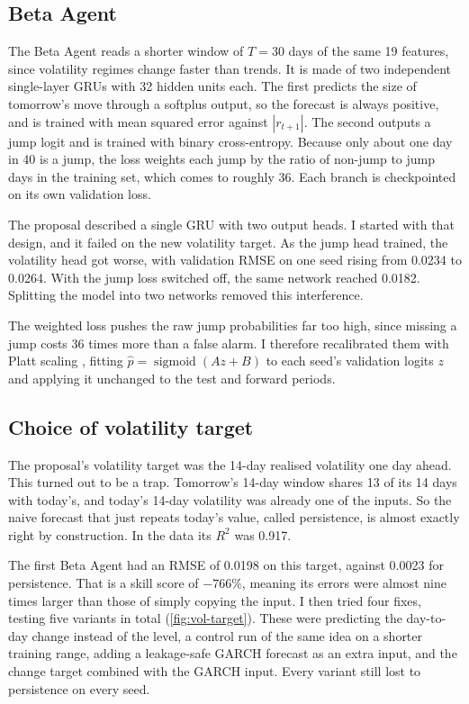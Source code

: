 \subsection{Beta Agent}

The Beta Agent reads a shorter window of $T=30$ days of the same 19 features, since volatility regimes change faster than trends. It is made of two independent single-layer GRUs with 32 hidden units each. The first predicts the size of tomorrow's move through a softplus output, so the forecast is always positive, and is trained with mean squared error against $|r_{t+1}|$. The second outputs a jump logit and is trained with binary cross-entropy. Because only about one day in 40 is a jump, the loss weights each jump by the ratio of non-jump to jump days in the training set, which comes to roughly 36. Each branch is checkpointed on its own validation loss.

The proposal described a single GRU with two output heads. I started with that design, and it failed on the new volatility target. As the jump head trained, the volatility head got worse, with validation RMSE on one seed rising from 0.0234 to 0.0264. With the jump loss switched off, the same network reached 0.0182. Splitting the model into two networks removed this interference.

The weighted loss pushes the raw jump probabilities far too high, since missing a jump costs 36 times more than a false alarm. I therefore recalibrated them with Platt scaling \cite{platt1999}, fitting $\hat p = \operatorname{sigmoid}(A z + B)$ to each seed's validation logits $z$ and applying it unchanged to the test and forward periods.

\subsection{Choice of volatility target}\label{sec:vol-target}

The proposal's volatility target was the 14-day realised volatility one day ahead. This turned out to be a trap. Tomorrow's 14-day window shares 13 of its 14 days with today's, and today's 14-day volatility was already one of the inputs. So the naive forecast that just repeats today's value, called persistence, is almost exactly right by construction. In the data its $R^2$ was 0.917.

The first Beta Agent had an RMSE of 0.0198 on this target, against 0.0023 for persistence. That is a skill score of $-766\%$, meaning its errors were almost nine times larger than those of simply copying the input. I then tried four fixes, testing five variants in total (\cref{fig:vol-target}). These were predicting the day-to-day change instead of the level, a control run of the same idea on a shorter training range, adding a leakage-safe GARCH forecast as an extra input, and the change target combined with the GARCH input. Every variant still lost to persistence on every seed.

